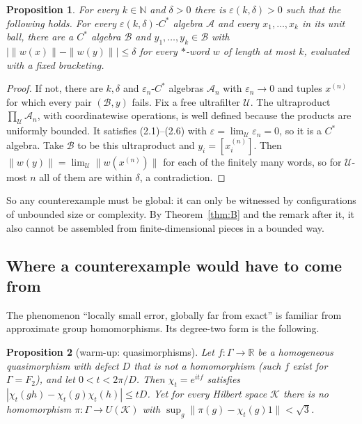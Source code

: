 \documentclass[11pt]{article}
\newtheorem{proposition}{Proposition}[section]
\theoremstyle{remark}
\newcommand{\eps}{\varepsilon}
\newcommand{\cA}{\mathcal{A}}
\newcommand{\cB}{\mathcal{B}}
\begin{document}
\begin{proposition}\label{prop:local}
For every $k\in\mathbb{N}$ and $\delta>0$ there is $\eps(k,\delta)>0$ such that the following holds. For every $\eps(k,\delta)$-$C^*$ algebra $\cA$ and every $x_1,\dots,x_k$ in its unit ball, there are a $C^*$ algebra $\cB$ and $y_1,\dots,y_k\in\cB$ with $|\|w(x)\|-\|w(y)\||\le\delta$ for every $*$-word $w$ of length at most $k$, evaluated with a fixed bracketing.
\end{proposition}

\begin{proof}
If not, there are $k,\delta$ and $\eps_n$-$C^*$ algebras $\cA_n$ with $\eps_n\to0$ and tuples $x^{(n)}$ for which every pair $(\cB,y)$ fails. Fix a free ultrafilter $\mathcal{U}$. The ultraproduct $\prod_\mathcal{U}\cA_n$, with coordinatewise operations, is well defined because the products are uniformly bounded. It satisfies (2.1)--(2.6) with $\eps=\lim_\mathcal{U}\eps_n=0$, so it is a $C^*$ algebra. Take $\cB$ to be this ultraproduct and $y_i=[x_i^{(n)}]$. Then $\|w(y)\|=\lim_\mathcal{U}\|w(x^{(n)})\|$ for each of the finitely many words, so for $\mathcal{U}$-most $n$ all of them are within $\delta$, a contradiction.
\end{proof}

So any counterexample must be global: it can only be witnessed by configurations of unbounded size or complexity. By Theorem~\ref{thm:B} and the remark after it, it also cannot be assembled from finite-dimensional pieces in a bounded way.

\subsection{Where a counterexample would have to come from}

The phenomenon ``locally small error, globally far from exact'' is familiar from approximate group homomorphisms. Its degree-two form is the following.

\begin{proposition}[warm-up: quasimorphisms]\label{prop:qm}
Let $f\colon\Gamma\to\mathbb{R}$ be a homogeneous quasimorphism with defect $D$ that is not a homomorphism (such $f$ exist for $\Gamma=F_2$), and let $0<t<2\pi/D$. Then $\chi_t=e^{itf}$ satisfies $|\chi_t(gh)-\chi_t(g)\chi_t(h)|\le tD$. Yet for every Hilbert space $\mathcal{K}$ there is no homomorphism $\pi\colon\Gamma\to U(\mathcal{K})$ with $\sup_g\|\pi(g)-\chi_t(g)1\|<\sqrt3$.
\end{proposition}
\end{document}
